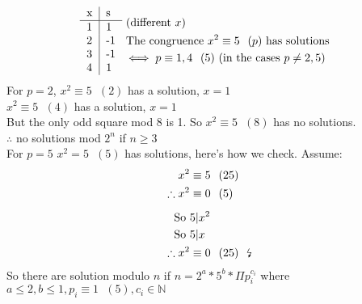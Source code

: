 \documentclass[11pt]{article}
\begin{document}
\begin{align*}
	\begin{tabular}{l|l}
		\multicolumn{1}{l|}{x} & \multicolumn{1}{l}{s} \\ \hline
		1                       & 1                      \\
		2                       & -1                     \\
		3                       & -1                     \\
		4                       & 1                     
	\end{tabular}&
	\begin{split}
		&\text{ (different $x$)}\\
		&\text{ The congruence $x^2 \equiv 5 \hspace{7pt} (p) $ has solutions}\\
		&\iff  p\equiv 1,4 \hspace{7pt} (5) \text{ (in the cases $p \neq 2, 5$)}
	\end{split}
\end{align*}
For $p=2$, \hspace{3pt} $x^2 \equiv 5 \hspace{7pt} (2) $ has a solution, $x=1$ \\
\hspace{55pt} $x^2 \equiv 5 \hspace{7pt}(4) $  has a solution, $x=1$\\ 
But the only odd square mod 8 is 1. So $x^2 \equiv 5 \hspace{7pt} (8)$ has no solutions.\\
$\therefore $ no solutions mod $2^n$ if $n\geq 3$\\[1em]
For $p=5$ \hspace{3pt} $x^2 = 5 \hspace{7pt} (5)$ has solutions, here's how we check. Assume:
\begin{align*}
	x^2 &\equiv 5 \hspace{7pt} (25)\\
	\therefore x^2 &\equiv 0 \hspace{7pt} (5) \\[0.5em]
	\text{So } & 5 | x^2 \\
	\text{So } & 5 | x \\
	\therefore x^2 &\equiv 0 \hspace{7pt} (25) \hspace{7pt} \text{\lightning}
\end{align*}
So there are solution modulo $n$ if  $n = 2^a * 5^b * \Pi p_i^{c_i} $ where $a\leq 2, b\leq 1, p_i \equiv 1 \hspace{7pt} (5),c_i \in \mathbb{N} $ \\[1em]
\end{document}
